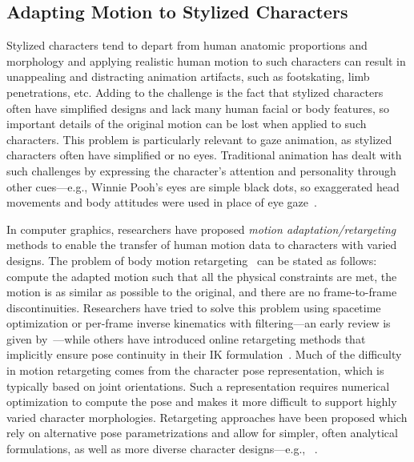 \subsection{Adapting Motion to Stylized Characters}

Stylized characters tend to depart from human anatomic proportions and morphology and applying realistic human motion to such characters can result in unappealing and distracting animation artifacts, such as footskating, limb penetrations, etc. Adding to the challenge is the fact that stylized characters often have simplified designs and lack many human facial or body features, so important details of the original motion can be lost when applied to such characters. This problem is particularly relevant to gaze animation, as stylized characters often have simplified or no eyes. Traditional animation has dealt with such challenges by expressing the character's attention and personality through other cues---e.g., Winnie Pooh's eyes are simple black dots, so exaggerated head movements and body attitudes were used in place of eye gaze~\citep{thomas1981illusion}.

In computer graphics, researchers have proposed \emph{motion adaptation/retargeting} methods to enable the transfer of human motion data to characters with varied designs. The problem of body motion retargeting~\citep{gleicher1998retargetting} can be stated as follows: compute the adapted motion such that all the physical constraints are met, the motion is as similar as possible to the original, and there are no frame-to-frame discontinuities. Researchers have tried to solve this problem using spacetime optimization or per-frame inverse kinematics with filtering---an early review is given by~\citet{gleicher2001comparing}---while others have introduced online retargeting methods that implicitly ensure pose continuity in their IK formulation~\citep{shin2001puppetry}. Much of the difficulty in motion retargeting comes from the character pose representation, which is typically based on joint orientations. Such a representation requires numerical optimization to compute the pose and makes it more difficult to support highly varied character morphologies. Retargeting approaches have been proposed which rely on alternative pose parametrizations and allow for simpler, often analytical formulations, as well as more diverse character designs---e.g., ~\citet{multon2008mkm,hecker2008real,ho2010spatial}.

